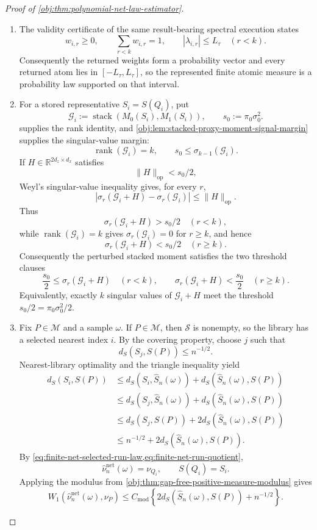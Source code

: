 \documentclass[11pt]{article}
\begin{document}
\begin{proof}[Proof of \cref{obj:thm:polynomial-net-law-estimator}]
\begin{enumerate}
\item The validity certificate of the same result-bearing spectral execution
states
\[
w_{i,r}\ge0,\qquad
\sum_{r<k}w_{i,r}=1,\qquad
|\lambda_{i,r}|\le L_\tau
\quad(r<k).
\]
Consequently the returned weights form a probability vector and every returned atom lies in \([-L_\tau,L_\tau]\), so the represented finite atomic measure is a probability law supported on that interval. %

\item For a stored representative \(S_i=S(Q_i)\), put
\[
\mathcal G_i:=\operatorname{stack}(M_0(S_i),M_1(S_i)),
\qquad
s_0:=\pi_0\sigma_0^2 .
\]
 supplies the rank identity,
and \cref{obj:lem:stacked-proxy-moment-signal-margin} supplies the
singular-value margin:
\[
\operatorname{rank}(\mathcal G_i)=k,
\qquad
s_0\le \sigma_{k-1}(\mathcal G_i).
\]
If \(H\in\mathbb R^{2d_z\times d_x}\) satisfies
\[
\|H\|_{\mathrm{op}}<s_0/2,
\]
Weyl's singular-value inequality gives, for every \(r\),
\[
|\sigma_r(\mathcal G_i+H)-\sigma_r(\mathcal G_i)|
\le \|H\|_{\mathrm{op}}.
\]
Thus
\[
\sigma_r(\mathcal G_i+H)>s_0/2\quad(r<k),
\]
while \(\operatorname{rank}(\mathcal G_i)=k\) gives
\(\sigma_r(\mathcal G_i)=0\) for \(r\ge k\), and hence
\[
\sigma_r(\mathcal G_i+H)<s_0/2\quad(r\ge k).
\]
Consequently the perturbed stacked moment satisfies the two threshold clauses
\[
\frac{s_0}{2}\le \sigma_r(\mathcal G_i+H)\quad(r<k),
\qquad
\sigma_r(\mathcal G_i+H)<\frac{s_0}{2}\quad(r\ge k).
\]
Equivalently, exactly \(k\) singular values of \(\mathcal G_i+H\) meet the
threshold \(s_0/2=\pi_0\sigma_0^2/2\). %

\item Fix \(P\in\mathcal M\) and a sample \(\omega\).  If \(P\in\mathcal M\),
then \(\mathscr S\) is nonempty, so the library has a selected nearest index
\(i\).  By the covering property, choose \(j\) such that
\[
d_S(S_j,S(P))\le n^{-1/2}.
\]
Nearest-library optimality and the triangle inequality yield
\[
\begin{aligned}
d_S(S_i,S(P))
&\le d_S(S_i,\widehat S_n(\omega))
   +d_S(\widehat S_n(\omega),S(P))\\
&\le d_S(S_j,\widehat S_n(\omega))
   +d_S(\widehat S_n(\omega),S(P))\\
&\le d_S(S_j,S(P))
   +2d_S(\widehat S_n(\omega),S(P))\\
&\le n^{-1/2}+2d_S(\widehat S_n(\omega),S(P)).
\end{aligned}
\]
By \cref{eq:finite-net-selected-run-law,eq:finite-net-run-quotient},
\[
\widehat\nu_n^{\mathrm{net}}(\omega)=\nu_{Q_i},
\qquad
S(Q_i)=S_i.
\]
Applying the modulus from \cref{obj:thm:gap-free-positive-measure-modulus}
gives
\[
W_1\!\left(\widehat\nu_n^{\mathrm{net}}(\omega),\nu_P\right)
\le
C_{\mathrm{mod}}
\left\{
2d_S(\widehat S_n(\omega),S(P))+n^{-1/2}
\right\}.
\] %


\end{enumerate}
\end{proof}
\end{document}
